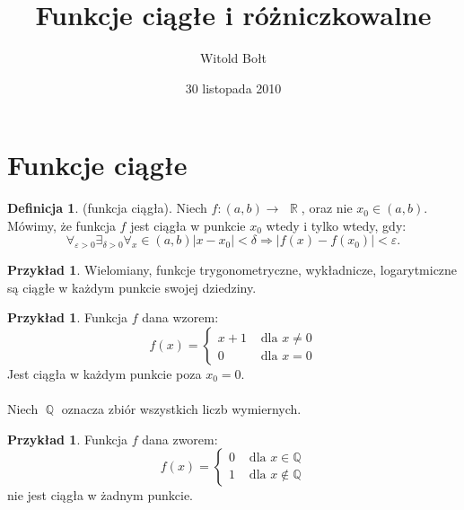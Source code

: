 \documentclass[12pt,a4paper]{article}
\title{Funkcje ciągłe i różniczkowalne}
\date{30 listopada 2010}
\author{Witold Bołt}
\theoremstyle{definition}
\newtheorem{df}[tw]{Definicja}
\newtheorem{ex}[tw]{Przykład}
\DeclareMathOperator{\R}{\mathbb{R}}
\DeclareMathOperator{\Q}{\mathbb{Q}}
\begin{document}
\maketitle

\tableofcontents

\section{Funkcje ciągłe}

\begin{df} 
(funkcja ciągła). Niech $f : (a, b) \rightarrow$  $\R$, oraz nie $x_{0} \in (a, b)$. Mówimy, że funkcja $f$ jest ciągła w punkcie $x_{0}$ wtedy i tylko wtedy, 
gdy:
\[ 
\forall_{\varepsilon >0}\exists_{\delta>0}\forall_{x} \in (a, b) \left |x - x_{0} \right| < \delta \Rightarrow \left |f(x) - f(x_{0})\right | < \varepsilon. 
\]
\end{df}
\begin{ex} 
Wielomiany, funkcje trygonometryczne, wykładnicze, logarytmiczne są ciągłe w każdym punkcie swojej dziedziny.
\end{ex}
\begin{ex}Funkcja $f$ dana wzorem:
\[ 
f(x)=\left\{\begin{matrix}
x + 1 & \textrm{ dla } x \neq  0 \\ 
0 & \textrm{ dla } x = 0 
\end{matrix}\right.
\]
Jest ciągła w każdym punkcie poza $x_{0} = 0$. \\ \\
\noindent Niech $\Q$ oznacza zbiór wszystkich liczb wymiernych.
\end{ex}
\begin{ex}Funkcja $f$ dana zworem:
\[ 
f(x)=\left\{\begin{matrix}
0 & \textrm{ dla } x \in \mathbb{Q} \\
1 & \textrm{ dla } x \notin \mathbb{Q}
\end{matrix}\right.
\] 
nie jest ciągła w żadnym punkcie.
\end{ex}
\end{document}
